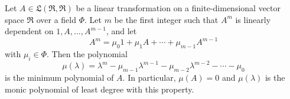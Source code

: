 Let $A \in \mathfrak{L}(\mathfrak{R}, \mathfrak{R})$ be a linear transformation on a finite-dimensional vector space $\mathfrak{R}$ over a field $\Phi$. Let $m$ be the first integer such that $A^m$ is linearly dependent on $1, A, \dots, A^{m-1}$, and let
$$A^m = \mu_0 1 + \mu_1 A + \cdots + \mu_{m-1} A^{m-1}$$
with $\mu_i \in \Phi$. Then the polynomial
$$\mu(\lambda) = \lambda^m - \mu_{m-1} \lambda^{m-1} - \mu_{m-2} \lambda^{m-2} - \cdots - \mu_0$$
is the minimum polynomial of $A$. In particular, $\mu(A) = 0$ and $\mu(\lambda)$ is the monic polynomial of least degree with this property.
